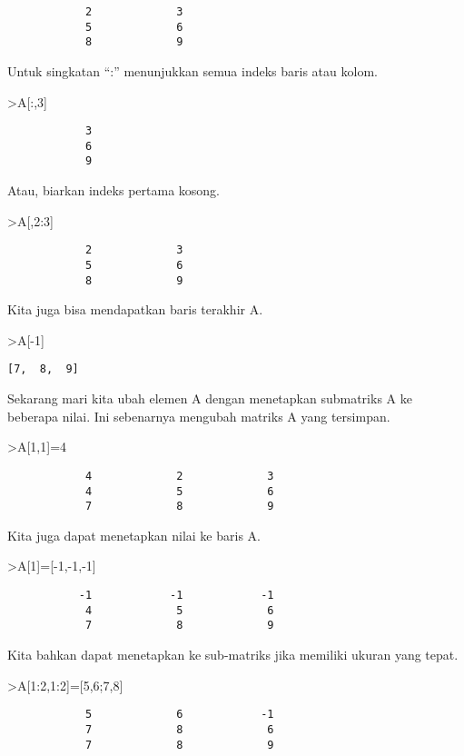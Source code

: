 \documentclass[
]{book}
\begin{document}
\begin{verbatim}
            2             3 
            5             6 
            8             9 
\end{verbatim}

Untuk singkatan ``:'' menunjukkan semua indeks baris atau kolom.

\textgreater A{[}:,3{]}

\begin{verbatim}
            3 
            6 
            9 
\end{verbatim}

Atau, biarkan indeks pertama kosong.

\textgreater A{[},2:3{]}

\begin{verbatim}
            2             3 
            5             6 
            8             9 
\end{verbatim}

Kita juga bisa mendapatkan baris terakhir A.

\textgreater A{[}-1{]}

\begin{verbatim}
[7,  8,  9]
\end{verbatim}

Sekarang mari kita ubah elemen A dengan menetapkan submatriks A ke beberapa nilai. Ini sebenarnya mengubah matriks A yang tersimpan.

\textgreater A{[}1,1{]}=4

\begin{verbatim}
            4             2             3 
            4             5             6 
            7             8             9 
\end{verbatim}

Kita juga dapat menetapkan nilai ke baris A.

\textgreater A{[}1{]}={[}-1,-1,-1{]}

\begin{verbatim}
           -1            -1            -1 
            4             5             6 
            7             8             9 
\end{verbatim}

Kita bahkan dapat menetapkan ke sub-matriks jika memiliki ukuran yang tepat.

\textgreater A{[}1:2,1:2{]}={[}5,6;7,8{]}

\begin{verbatim}
            5             6            -1 
            7             8             6 
            7             8             9 
\end{verbatim}
\end{document}

